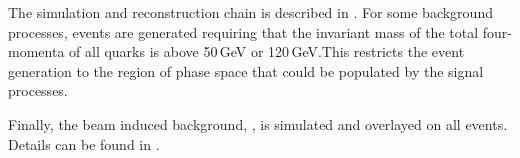 
The simulation and reconstruction chain is described in . For some background processes, events are generated requiring that the invariant mass of the total four-momenta of all quarks is above 50\,GeV or 120\,GeV.This restricts the event generation to the region of phase space that could be populated by the signal processes.




Finally, the beam induced background, \ggHad, is simulated and overlayed on all events. Details can be found in .

